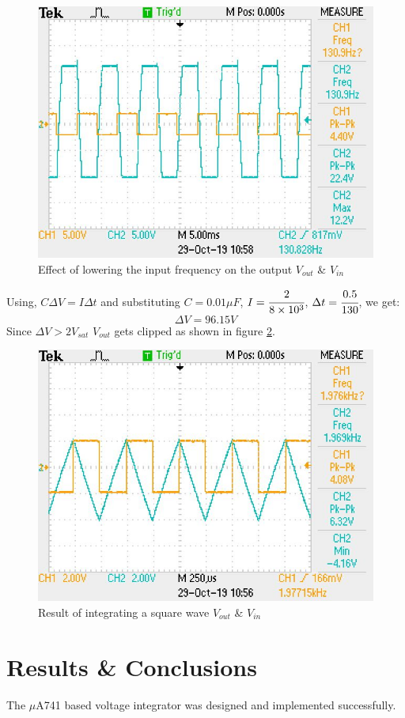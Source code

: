 \documentclass[12pt, titlepage]{article}
\theoremstyle{definition}
\begin{document}
    \begin{figure}[!h]
      \centering
      \includegraphics[scale=0.5]{images/results_q4_2.jpeg}
      \caption{Effect of lowering the input frequency on the output \color{cyan}$V_{out}$ \color{black}\& \color{orange}$V_{in}$}
      \label{fig:results_q3}
    \end{figure}

    Using, $ C\Delta V = I\Delta t$ and substituting $C=0.01\mu F$, $I=\cfrac{2}{8\times 10^3}$, $\Delta t = \cfrac{0.5}{130}$, we get:
    $$ \Delta V = 96.15 V$$
    Since $\Delta V > 2V_{sat}$ \text{, } $V_{out}$ gets clipped as shown in figure \ref{fig:results_q4}.

    \begin{figure}[!h]
      \centering
      \includegraphics[scale=0.5]{images/results_q3.jpeg}
      \caption{Result of integrating a square wave \color{cyan}$V_{out}$ \color{black}\& \color{orange}$V_{in}$}
      \label{fig:results_q4}
    \end{figure}

  \clearpage
  \section{Results \& Conclusions}
  The $\mu$A741 based voltage integrator was designed and implemented successfully.
\end{document}
